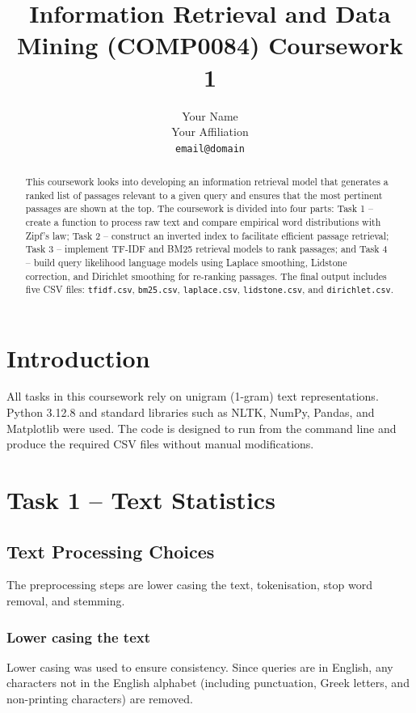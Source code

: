 \documentclass[11pt]{article}
\title{\LARGE \textbf{Information Retrieval and Data Mining (COMP0084) Coursework 1}}
\author{Your Name \\
Your Affiliation \\
\texttt{email@domain}}
\date{}
\begin{document}
\maketitle

\begin{abstract}
This coursework looks into developing an information retrieval model that generates a ranked list of passages relevant to a given query and ensures that the most pertinent passages are shown at the top. The coursework is divided into four parts: Task 1 -- create a function to process raw text and compare empirical word distributions with Zipf's law; Task 2 -- construct an inverted index to facilitate efficient passage retrieval; Task 3 -- implement TF-IDF and BM25 retrieval models to rank passages; and Task 4 -- build query likelihood language models using Laplace smoothing, Lidstone correction, and Dirichlet smoothing for re-ranking passages. The final output includes five CSV files: \texttt{tfidf.csv}, \texttt{bm25.csv}, \texttt{laplace.csv}, \texttt{lidstone.csv}, and \texttt{dirichlet.csv}.
\end{abstract}

\section{Introduction}
All tasks in this coursework rely on unigram (1-gram) text representations. Python 3.12.8 and standard libraries such as NLTK, NumPy, Pandas, and Matplotlib were used. The code is designed to run from the command line and produce the required CSV files without manual modifications.

\section{Task 1 -- Text Statistics}

\subsection{Text Processing Choices}
The preprocessing steps are lower casing the text, tokenisation, stop word removal, and stemming.

\subsubsection{Lower casing the text}
Lower casing was used to ensure consistency. Since queries are in English, any characters not in the English alphabet (including punctuation, Greek letters, and non-printing characters) are removed.
\end{document}
